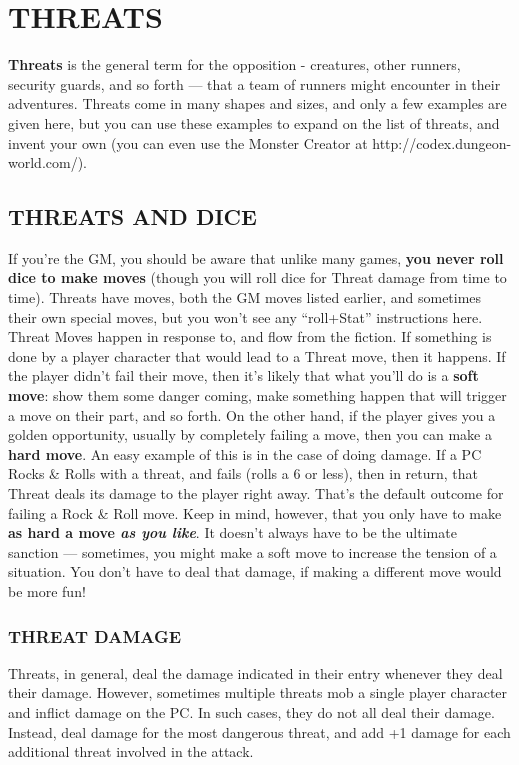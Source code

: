 \documentclass[oneside,10pt]{article}
\begin{document}
\section{THREATS}
\begin{multicols}{2}
\textbf{Threats} is the general term for the opposition - creatures, 
other runners, security guards, and so forth — that a team of 
  runners might encounter in their adventures. Threats come in 
  many shapes and sizes, and only a few examples are given 
  here, but you can use these examples to expand on the list of 
  threats, and invent your own (you can even use the Monster 
  Creator at http://codex.dungeon-world.com/). 

\subsection{THREATS AND DICE}
If you’re the GM, you should be aware that unlike many
games, \textbf{you never roll dice to make moves} (though you will
roll dice for Threat damage from time to time).
Threats have moves, both the GM moves listed earlier, and
sometimes their own special moves, but you won’t see any
“roll+Stat” instructions here. Threat Moves happen in response to, and flow from the fiction. If something is done by
a player character that would lead to a Threat move, then it
happens. If the player didn’t fail their move, then it’s likely
that what you’ll do is a \textbf{soft move}: show them some danger
coming, make something happen that will trigger a move on
their part, and so forth.
On the other hand, if the player gives you a golden opportunity, usually by completely failing a move, then you can
make a \textbf{hard move}. An easy example of this is in the case of
doing damage. If a PC Rocks \& Rolls with a threat, and fails
(rolls a 6 or less), then in return, that Threat deals its damage
to the player right away. That’s the default outcome for failing
a Rock \& Roll move.
Keep in mind, however, that you only have to make \textbf{as hard
a move \textit{as you like}}. It doesn’t always have to be the ultimate
sanction — sometimes, you might make a soft move to increase the tension of a situation. You don’t have to deal that
damage, if making a different move would be more fun!

\subsubsection{THREAT DAMAGE}
Threats, in general, deal the damage indicated in their entry
whenever they deal their damage. However, sometimes multiple threats mob a single player character and inflict damage
on the PC. In such cases, they do not all deal their damage.
Instead, deal damage for the most dangerous threat, and add
+1 damage for each additional threat involved in
the attack.


\end{multicols}
\end{document}
